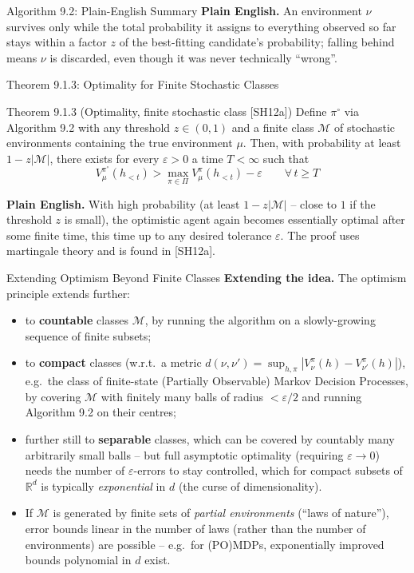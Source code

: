 \documentclass[aspectratio=169,10pt]{beamer}
\newcommand{\R}{\mathbb{R}}
\begin{document}
\begin{frame}{Algorithm 9.2: Plain-English Summary}
  \textbf{Plain English.} An environment $\nu$ survives only while the
  total probability it assigns to everything observed so far stays within
  a factor $z$ of the best-fitting candidate's probability; falling behind
  means $\nu$ is discarded, even though it was never technically
  ``wrong''.
\end{frame}

\begin{frame}{Theorem 9.1.3: Optimality for Finite Stochastic Classes}
  \begin{block}{Theorem 9.1.3 (Optimality, finite stochastic class [SH12a])}
    Define $\pi^\circ$ via Algorithm 9.2 with any threshold
    $z\in(0,1)$ and a finite class $\mathcal{M}$ of stochastic environments
    containing the true environment $\mu$. Then, with probability at least
    $1-z|\mathcal{M}|$, there exists for every $\varepsilon>0$ a time
    $T<\infty$ such that
    \[
      V^{\pi^\circ}_\mu(h_{<t}) > \max_{\pi\in\Pi} V^\pi_\mu(h_{<t}) - \varepsilon \qquad \forall\, t\ge T
    \]
  \end{block}
  \textbf{Plain English.} With high probability (at least
  $1-z|\mathcal{M}|$ -- close to $1$ if the threshold $z$ is small), the
  optimistic agent again becomes essentially optimal after some finite
  time, this time up to any desired tolerance $\varepsilon$. The proof uses
  martingale theory and is found in [SH12a].
\end{frame}

\begin{frame}{Extending Optimism Beyond Finite Classes}
  \textbf{Extending the idea.} The optimism principle extends further:
  \begin{itemize}
    \item to \textbf{countable} classes $\mathcal{M}$, by running the
      algorithm on a slowly-growing sequence of finite subsets;
    \item to \textbf{compact} classes (w.r.t.\ a metric
      $d(\nu,\nu')=\sup_{h,\pi}|V^\pi_\nu(h)-V^\pi_{\nu'}(h)|$), e.g.\ the
      class of finite-state (Partially Observable) Markov Decision
      Processes, by covering $\mathcal{M}$ with finitely many balls of
      radius $<\varepsilon/2$ and running Algorithm 9.2 on their centres;
    \item further still to \textbf{separable} classes, which can be
      covered by countably many arbitrarily small balls -- but full
      asymptotic optimality (requiring $\varepsilon\to0$) needs the number
      of $\varepsilon$-errors to stay controlled, which for compact subsets
      of $\R^d$ is typically \emph{exponential} in $d$ (the curse of
      dimensionality).
    \item If $\mathcal{M}$ is generated by finite sets of \emph{partial
      environments} (``laws of nature''), error bounds linear in the
      number of laws (rather than the number of environments) are
      possible -- e.g.\ for (PO)MDPs, exponentially improved bounds
      polynomial in $d$ exist.
  \end{itemize}
\end{frame}
\end{document}
